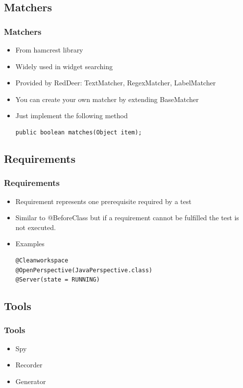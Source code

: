 \documentclass{beamer}
\begin{document}
\subsection{Matchers}
\begin{frame}[fragile]
\frametitle{Matchers}
\begin{itemize}
\item From hamcrest library
\item Widely used in widget searching
\item Provided by RedDeer: TextMatcher, RegexMatcher, LabelMatcher
\item You can create your own matcher by extending BaseMatcher
\item Just implement the following method
\begin{lstlisting}
public boolean matches(Object item);
\end{lstlisting}
\end{itemize}
\end{frame}

\subsection{Requirements}
\begin{frame}[fragile]
\frametitle{Requirements}
\begin{itemize}
\item Requirement represents one prerequisite required by a test
\item Similar to @BeforeClass but if a requirement cannot be fulfilled the test is not executed.
\item Examples
\begin{lstlisting}
@Cleanworkspace 
@OpenPerspective(JavaPerspective.class)
@Server(state = RUNNING)
\end{lstlisting}
\end{itemize}
\end{frame}

\subsection{Tools}
\begin{frame}[fragile]
\frametitle{Tools}
\begin{itemize}
\item Spy
\item Recorder
\item Generator
\end{itemize}
\end{frame}
\end{document}
